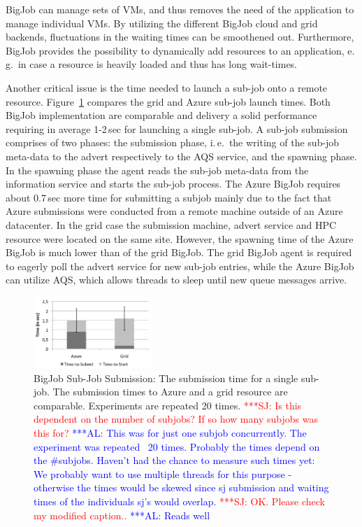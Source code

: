 \documentclass[conference,final]{IEEEtran}
\newcommand{\up}{\vspace*{-1em}}
\newcommand{\alnote}[1]{ {\textcolor{blue} { ***AL: #1 }}}
\newcommand{\jhanote}[1]{ {\textcolor{red} { ***SJ: #1 }}}
\newcommand{\alnote}[1]{}
\newcommand{\jhanote}[1]{}
\begin{document}
BigJob can manage sets of VMs, and thus removes the need of the
application to manage individual VMs. By utilizing the different
BigJob cloud and grid backends, fluctuations in the waiting times can
be smoothened out. Furthermore, BigJob provides the possibility to
dynamically add resources to an application, e.\,g.\ in case a
resource is heavily loaded and thus has long wait-times.

Another critical issue is the time needed to launch a sub-job onto a
remote resource. Figure~\ref{fig:performance_startup} compares the
grid and Azure sub-job launch times. Both BigJob implementation are
comparable and delivery a solid performance requiring in average
1-2\,sec for launching a single sub-job. A sub-job submission
comprises of two phases: the submission phase, i.\,e.\ the writing of
the sub-job meta-data to the advert respectively to the AQS service,
and the spawning phase. In the spawning phase the agent reads the
sub-job meta-data from the information service and starts the sub-job
process. The Azure BigJob requires about 0.7\,sec more time for
submitting a subjob mainly due to the fact that Azure submissions were
conducted from a remote machine outside of an Azure datacenter. In the
grid case the submission machine, advert service and HPC resource were
located on the same site.  However, the spawning time of the Azure
BigJob is much lower than of the grid BigJob. The grid BigJob agent is
required to eagerly poll the advert service for new sub-job entries,
while the Azure BigJob can utilize AQS, which allows threads to sleep
until new queue messages arrive.
\begin{figure}[htbp]
    \centering
        \includegraphics[width=0.4\textwidth]{performance/startup.pdf}
        \caption{BigJob Sub-Job Submission: The submission time for
          a single sub-job. The submission times to Azure and a grid
          resource are comparable. Experiments are repeated 20 times.
          \jhanote{Is this dependent on the number of subjobs?
            If so how many subjobs was this for?}\alnote{This was for
            just one subjob concurrently. The experiment was repeated
            ~20 times.  Probably the times depend on the
            \#subjobs. Haven't had the chance to measure such times
            yet: We probably want to use multiple threads for this
            purpose - otherwise the times would be skewed since sj
            submission and waiting times of the individuals sj's would
            overlap.}\jhanote{OK. Please check my modified caption..}
            \alnote{Reads well}}
    \label{fig:performance_startup}
    \up\up
\end{figure}
\end{document}
